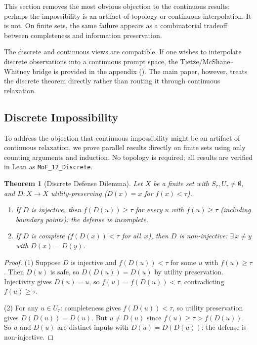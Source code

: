 \documentclass[11pt]{article}
\newtheorem{theorem}{Theorem}[section]
\begin{document}
This section removes the most obvious objection to the continuous
results: perhaps the impossibility is an artifact of topology or
continuous interpolation. It is not. On finite sets, the same failure
appears as a combinatorial tradeoff between completeness and
information preservation.

The discrete and continuous views are compatible. If one wishes to
interpolate discrete observations into a continuous prompt space, the
Tietze/McShane--Whitney bridge is provided in the appendix
(). The main paper, however, treats the discrete
theorem directly rather than routing it through continuous relaxation.

\subsection{Discrete Impossibility}

To address the objection that continuous impossibility might be an
artifact of continuous relaxation, we prove parallel results directly
on finite sets using only counting arguments and induction. No
topology is required; all results are verified in Lean as
\texttt{MoF\_12\_Discrete}.

\begin{theorem}[Discrete Defense Dilemma]
\label{thm:disc-dilemma}
Let $X$ be a finite set with $S_\tau, U_\tau \neq \emptyset$, and
$D\colon X \to X$ utility-preserving ($D(x) = x$ for $f(x) < \tau$).
\begin{enumerate}[nosep]
  \item If $D$ is injective, then $f(D(u)) \geq \tau$ for every
    $u$ with $f(u) \geq \tau$ (including boundary points): the
    defense is incomplete.
  \item If $D$ is complete ($f(D(x)) < \tau$ for all~$x$), then $D$ is
    non-injective: $\exists\, x \neq y$ with $D(x) = D(y)$.
\end{enumerate}
\end{theorem}

\begin{proof}
(1) Suppose $D$ is injective and $f(D(u)) < \tau$ for some $u$ with
$f(u) \geq \tau$. Then $D(u)$ is safe, so $D(D(u)) = D(u)$ by utility
preservation. Injectivity gives $D(u) = u$, so
$f(u) = f(D(u)) < \tau$, contradicting $f(u) \geq \tau$.

(2) For any $u \in U_\tau$: completeness gives $f(D(u)) < \tau$, so
utility preservation gives $D(D(u)) = D(u)$. But
$u \neq D(u)$ since $f(u) \geq \tau > f(D(u))$.
So $u$ and $D(u)$ are distinct inputs with $D(u) = D(D(u))$: the
defense is non-injective.
\end{proof}
\end{document}
